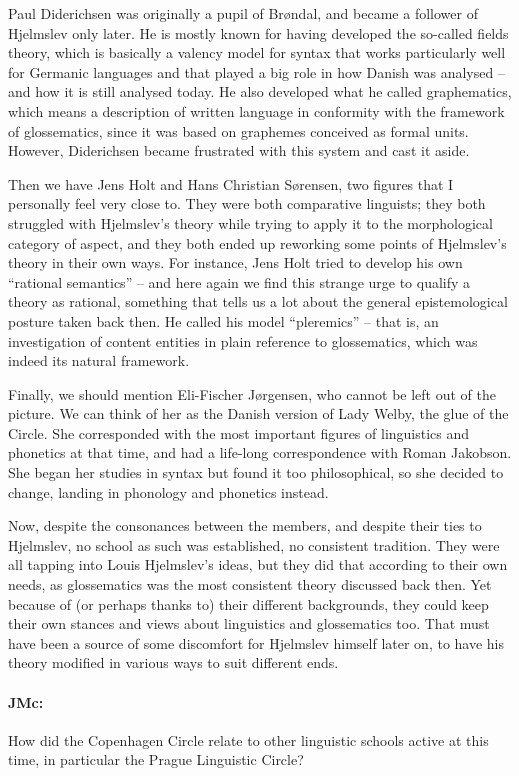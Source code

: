 \documentclass[output=paper]{langscibook}
\begin{document}
Paul Diderichsen was originally a pupil of Brøndal, and became a follower of Hjelmslev only later. He is mostly known for having developed the so-called fields theory, which is basically a valency model for syntax that works particularly well for Germanic languages and that played a big role in how Danish was analysed – and how it is still analysed today. He also developed what he called graphematics, which means a description of written language in conformity with the framework of glossematics, since it was based on graphemes conceived as formal units. However, Diderichsen became frustrated with this system and cast it aside.

Then we have Jens Holt and Hans Christian Sørensen, two figures that I personally feel very close to. They were both comparative linguists; they both struggled with Hjelmslev’s theory while trying to apply it to the morphological category of aspect, and they both ended up reworking some points of Hjelmslev’s theory in their own ways. For instance, Jens Holt tried to develop his own “rational semantics” – and here again we find this strange urge to qualify a theory as rational, something that tells us a lot about the general epistemological posture taken back then. He called his model “pleremics” – that is, an investigation of content entities in plain reference to glossematics, which was indeed its natural framework. 

Finally, we should mention Eli-Fischer Jørgensen, who cannot be left out of the picture. We can think of her as the Danish version of Lady Welby, the glue of the Circle. She corresponded with the most important figures of linguistics and phonetics at that time, and had a life-long correspondence with Roman Jakobson. She began her studies in syntax but found it too philosophical, so she decided to change, landing in phonology and phonetics instead. 

Now, despite the consonances between the members, and despite their ties to Hjelmslev, no school as such was established, no consistent tradition. They were all tapping into Louis Hjelmslev’s ideas, but they did that according to their own needs, as glossematics was the most consistent theory discussed back then. Yet because of (or perhaps thanks to) their different backgrounds, they could keep their own stances and views about linguistics and glossematics too. That must have been a source of some discomfort for Hjelmslev himself later on, to have his theory modified in various ways to suit different ends.

\paragraph*{JMc:} How did the Copenhagen Circle relate to other linguistic schools active at this time, in particular the Prague Linguistic Circle?
\end{document}
